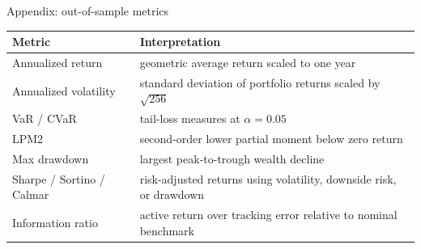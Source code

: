 \documentclass[10pt,aspectratio=169]{beamer}
\begin{document}
\begin{frame}{Appendix: out-of-sample metrics}
  \small
  \begin{tabular}{>{\raggedright\arraybackslash}p{.25\linewidth}p{.62\linewidth}}
    \toprule
    Metric & Interpretation \\
    \midrule
    Annualized return & geometric average return scaled to one year \\
    Annualized volatility & standard deviation of portfolio returns scaled by $\sqrt{256}$ \\
    VaR / CVaR & tail-loss measures at $\alpha=0.05$ \\
    LPM2 & second-order lower partial moment below zero return \\
    Max drawdown & largest peak-to-trough wealth decline \\
    Sharpe / Sortino / Calmar & risk-adjusted returns using volatility, downside risk, or drawdown \\
    Information ratio & active return over tracking error relative to nominal benchmark \\
    \bottomrule
  \end{tabular}
\end{frame}
\end{document}
